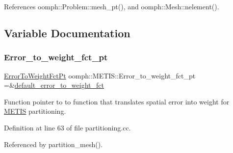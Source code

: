 References oomph\+::\+Problem\+::mesh\+\_\+pt(), and oomph\+::\+Mesh\+::nelement().



\subsection{Variable Documentation}
\mbox{\label{namespaceoomph_1_1METIS_af21fbb8dba025be51b3e27c1822243a5}} 
\subsubsection{\texorpdfstring{Error\+\_\+to\+\_\+weight\+\_\+fct\+\_\+pt}{Error\_to\_weight\_fct\_pt}}
{\footnotesize\ttfamily \hyperlink{namespaceoomph_1_1METIS_aec228e35df8426d16639b961fcf98df1}{Error\+To\+Weight\+Fct\+Pt} oomph\+::\+M\+E\+T\+I\+S\+::\+Error\+\_\+to\+\_\+weight\+\_\+fct\+\_\+pt =\&\hyperlink{namespaceoomph_1_1METIS_af5633647d4ff099648151db2d7d0a1e5}{default\+\_\+error\+\_\+to\+\_\+weight\+\_\+fct}}



Function pointer to to function that translates spatial error into weight for \hyperlink{namespaceoomph_1_1METIS}{M\+E\+T\+IS} partitioning. 



Definition at line 63 of file partitioning.\+cc.



Referenced by partition\+\_\+mesh().

